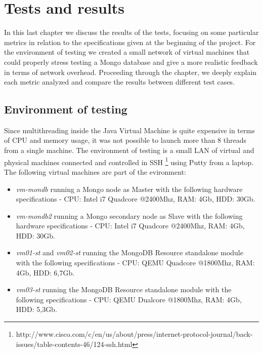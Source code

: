 \chapter{Tests and results}
\label{cha:4}
In this last chapter we discuss the results of the tests, focusing on some particular metrics in relation to the specifications given at the beginning of the project. For the environment of testing we created a small network of virtual machines that could properly stress testing a Mongo database and give a more realistic feedback in terms of network overhead.
Proceeding through the chapter, we deeply explain each metric analyzed and compare the results between different test cases.

\section{Environment of testing}
\label{sec:1}
Since multithreading inside the Java Virtual Machine is quite expensive in terms of CPU and memory usage, it was not possible to launch more than 8 threads from a single machine. 
The environment of testing is a small LAN of virtual and physical machines connected and controlled in SSH \footnote{http://www.cisco.com/c/en/us/about/press/internet-protocol-journal/back-issues/table-contents-46/124-ssh.html} using Putty from a laptop.
The following virtual machines are part of the evironment: 
\begin{itemize}
	\item \textit{vm-mondb} running a Mongo node as Master with the following hardware specifications - CPU: Intel i7 Quadcore @2400Mhz, RAM: 4Gb, HDD: 30Gb.
	\item \textit{vm-mondb2} running a Mongo secondary node as Slave with the following hardware specifications - CPU: Intel i7 Quadcore @2400Mhz, RAM: 4Gb, HDD: 30Gb.
	\item \textit{vm01-st} and \textit{vm02-st} running the MongoDB Resource standalone module with the following specifications - CPU: QEMU Quadcore @1800Mhz, RAM: 4Gb, HDD: 6,7Gb.
	\item \textit{vm03-st} running the MongoDB Resource standalone module with the following specifications - CPU: QEMU Dualcore @1800Mhz, RAM: 4Gb, HDD: 5,3Gb.
\end{itemize}

